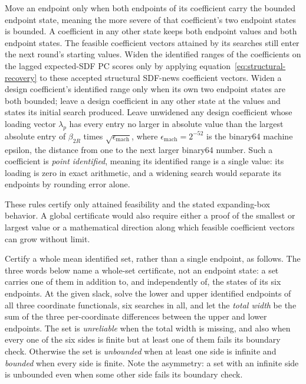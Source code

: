 \documentclass[11pt]{article}
\begin{document}
Move an endpoint only when both endpoints of its coefficient carry the bounded endpoint state,
meaning the more severe of that coefficient's two endpoint states is bounded. A coefficient in any
other state keeps both endpoint values and both endpoint states. The feasible coefficient vectors
attained by its searches still enter the next round's starting values. Widen the identified ranges of the coefficients
on the lagged expected-SDF PC scores only by applying
equation~\eqref{eq:structural-recovery} to these accepted structural SDF-news coefficient vectors.
Widen a design coefficient's identified range only when its own two endpoint states are both
bounded; leave a design coefficient in any other state at the values and states its initial search
produced.
Leave unwidened any design coefficient whose loading vector \(\lambda_p\) has every entry no larger in
absolute value than the largest absolute entry of \(\beta_{2R}\) times
\(\sqrt{\epsilon_{\mathrm{mach}}}\), where \(\epsilon_{\mathrm{mach}}=2^{-52}\) is the binary64
machine epsilon, the distance from one to the next larger binary64 number. Such a coefficient is
\emph{point identified}, meaning its identified range is a single value: its loading is zero in exact
arithmetic, and a widening search would separate its endpoints by rounding error alone.

These rules certify only attained feasibility and the stated expanding-box behavior. A global
certificate would also require either a proof of the smallest or largest value or a mathematical
direction along which feasible coefficient vectors can grow without limit.

Certify a whole mean identified set, rather than a single endpoint, as follows. The three words
below name a whole-set certificate, not an endpoint state: a set carries one of them in addition to,
and independently of, the states of its six endpoints. At the given slack,
solve the lower and upper identified endpoints of all three coordinate functionals, six searches in
all, and let the \emph{total width} be the sum of the three per-coordinate differences between the
upper and lower endpoints. The set is \emph{unreliable} when the total width is missing, and also
when every one of the six sides is finite but at least one of them fails its boundary check.
Otherwise the set is \emph{unbounded} when at least one side is infinite and \emph{bounded} when
every side is finite. Note the asymmetry: a set with an infinite side is unbounded even when some other
side fails its boundary check.
\end{document}
